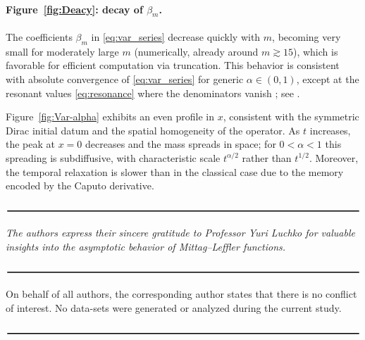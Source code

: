 \documentclass[12pt, reqno]{amsart}
\begin{document}
\paragraph{Figure~\ref{fig:Deacy}: decay of $\beta_m$.}
The coefficients $\beta_m$ in \eqref{eq:var_series} decrease quickly with $m$, becoming very small for
moderately large $m$ (numerically, already around $m\gtrsim 15$), which is favorable for efficient computation
via truncation. This behavior is consistent with absolute convergence of \eqref{eq:var_series} for generic
$\alpha\in(0,1)$, except at the resonant values \eqref{eq:resonance} where the denominators vanish ; see \cite[\S4.4]{Beltagy1}.


Figure~\ref{fig:Var-alpha} exhibits an even profile in $x$, consistent with the symmetric Dirac initial datum
and the spatial homogeneity of the operator. As $t$ increases, the peak at $x=0$ decreases and the mass spreads
in space; for $0<\alpha<1$ this spreading is subdiffusive, with characteristic scale $t^{\alpha/2}$ rather than
$t^{1/2}$. Moreover, the temporal relaxation is slower than in the classical case due to the memory encoded by
the Caputo derivative. 













\noindent$\rule[0.05cm]{16.5cm}{0.05cm}$

 {\em The authors express their sincere gratitude to Professor Yuri Luchko for valuable insights into the asymptotic behavior of Mittag–Leffler functions.}

\noindent$\rule[0.05cm]{16.5cm}{0.05cm}$

On behalf of all authors, the corresponding author states that there is no conflict of interest. 
No data-sets were generated or analyzed during the current study.

\noindent$\rule[0.05cm]{16.5cm}{0.05cm}$
\end{document}
